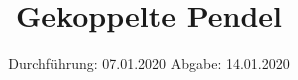 

\subject{Versuch 106}
\title{Gekoppelte Pendel}
\date{%
  Durchführung: 07.01.2020
  \hspace{3em}
  Abgabe: 14.01.2020
}



\maketitle

\thispagestyle{empty}
\tableofcontents
\newpage









\printbibliography{}


